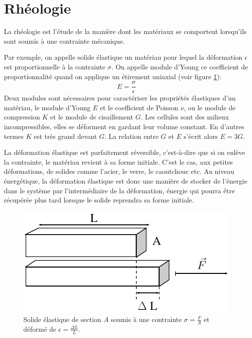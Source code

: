 \section{Rhéologie}

La rhéologie est l'étude de la manière dont les matériaux se comportent lorsqu'ils sont soumis à une contrainte mécanique.

Par exemple, on appelle solide élastique un matériau pour lequel la déformation $\epsilon$ est proportionnelle à la contrainte $ \sigma$. On appelle module d'Young ce coefficient de proportionnalité quand on applique un étirement uniaxial (voir figure \ref{young}): 
$$ E = \frac{\sigma}{\epsilon}$$
 Deux modules sont nécessaires pour caractériser les propriétés élastiques d'un matériau, le module d'Young $E$ et le coefficient de Poisson $\nu$, ou le module de compression $K$ et le module de cisaillement $G$. Les cellules sont des milieux incompressibles, elles se déforment
en gardant leur volume constant. En d'autres termes $K$ est très grand devant $G$. La relation entre $G$ et $E$ s'écrit alors $E=3G$.

La déformation élastique est parfaitement réversible, c'est-à-dire que si on enlève la contrainte, le matériau revient à sa forme initiale. C'est le cas, aux petites déformations, de solides comme l'acier, le verre, le caoutchouc etc. Au niveau énergétique, la déformation élastique est donc une manière de stocker de l'énergie dans le système par l'intermédiaire de la déformation, énergie qui pourra être récupérée plus tard lorsque le solide reprendra sa forme initiale. 

\begin{figure}
\includegraphics[scale=0.5]{Figures/Young_modulus.pdf} 
\caption{Solide élastique de section $A$ soumis à une contrainte $\sigma=\frac{F}{A}$ et déformé de $\epsilon=\frac{\Delta L}{L}$. \label{young} }
\end{figure}

